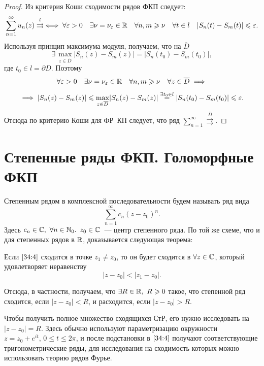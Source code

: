 \documentclass[../../main.tex]{subfiles}
\begin{document}
\begin{proof}
	Из критерия Коши сходимости рядов ФКП следует:
	\[ \sum\limits_{n = 1}^{\infty} u_n(z) \overset{l}\rightrightarrows \iff 
	\forall \varepsilon > 0\quad \exists \nu = \nu_\varepsilon \in \mathbb{R} \quad \forall n, m 
	\geqslant \nu \quad \forall t \in l \quad |S_n(t) - S_m(t)| \leqslant \varepsilon. \]
	Используя принцип максимума модуля, получаем, что на $ \overline{D} $ 
	\[\exists\, \underset{z \in \overline{D}}{\max}|S_n(z) - S_m(z)| = |S_n(t_0) 
	- S_m(t_0)| ,\] 
	где $ t_0 \in l = \partial D $.
	Поэтому \[ \forall \varepsilon > 0\quad \exists \nu = \nu_\varepsilon \in \mathbb{R} \quad \forall 
	n, m \geqslant \nu \quad \forall z \in \overline{D} \implies\]
	\[\implies |S_n(z) - S_m(z)| 
	\leqslant \underset{z \in \overline{D}}{\max}|S_n(z) - S_m(z)| \overset{\exists 
	t_0 \in l}= 
	|S_n(t_0) - S_m(t_0)| \leqslant \varepsilon.\]
	Отсюда по критерию Коши для ФР~КП следует, что ряд $ \sum\limits_{n = 
	1}^{\infty} \overset{\overline{D}}\rightrightarrows $.
\end{proof}

\section{Степенные ряды ФКП. Голоморфные ФКП}

Степенным рядом в комплексной последовательности будем называть ряд вида
\begin{equation}\label{34:4}
	\sum\limits_{n = 1}^{\infty} c_n (z - z_0)^n.
\end{equation}
Здесь $ c_n \in \mathbb{C},\ \forall n \in \mathbb{N}_0.$ $z_0 \in \mathbb{C} $~--- центр 
степенного ряда. По той же схеме, что и для степенных рядов в $ \mathbb{R} $, 
доказывается следующая теорема:
\begin{thm}
	Если $ \eqref{34:4} $ сходится в точке $ z_1 \neq z_0 $, то он будет сходится 
	в
	$ \forall z \in \mathbb{C} $, который удовлетворяет неравенству
	\[ |z - z_0| < |z_1 - z_0|. \]
\end{thm}

Отсюда, в частности, получаем, что $ \exists R \in \mathbb{R},\ R \geqslant 0$ такое, 
что степенной ряд сходится, если $ |z - z_0| < R $, и расходится, если
$ |z - z_0| > R $.

Чтобы получить полное множество сходящихся СтР, его нужно исследовать на
${|z - z_0| = R}$. Здесь обычно используют параметризацию окружности
$ z = z_0 + e^{it},\, 0 \leq t \leq 2\pi $, и после подстановки в $ 
\eqref{34:4} $ получают 
соответствующие тригонометрические ряды, для исследования на сходимость 
которых можно использовать теорию рядов Фурье.
\end{document}
